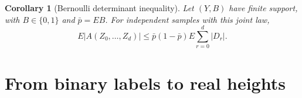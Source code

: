 \documentclass[11pt]{article}
\newtheorem{corollary}[theorem]{Corollary}
\theoremstyle{remark}
\newcommand{\E}{E}
\begin{document}
\begin{aiblock}
\begin{corollary}[Bernoulli determinant inequality]
\label{cor:iid}
Let $(Y,B)$ have finite support, with $B\in\{0,1\}$ and $\bar p=\E B$.
For independent samples with this joint law,
\begin{equation}
\E|A(Z_0,\ldots,Z_d)|\leq\bar p(1-\bar p)\E\sum_{r=0}^d|D_r|.
\end{equation}
\end{corollary}



\end{aiblock}

\section{From binary labels to real heights}
\label{sec:layercake}
\end{document}

